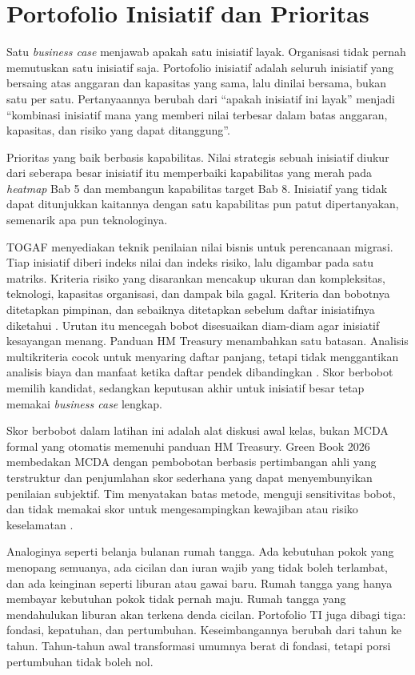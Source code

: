 \section{Portofolio Inisiatif dan Prioritas}

Satu \textit{business case} menjawab apakah satu inisiatif layak. Organisasi
tidak pernah memutuskan satu inisiatif saja. Portofolio inisiatif adalah
seluruh inisiatif yang bersaing atas anggaran dan kapasitas yang sama, lalu
dinilai bersama, bukan satu per satu. Pertanyaannya berubah dari ``apakah
inisiatif ini layak'' menjadi ``kombinasi inisiatif mana yang memberi nilai
terbesar dalam batas anggaran, kapasitas, dan risiko yang dapat
ditanggung''.

Prioritas yang baik berbasis kapabilitas. Nilai strategis sebuah inisiatif
diukur dari seberapa besar inisiatif itu memperbaiki kapabilitas yang merah
pada \textit{heatmap} Bab 5 dan membangun kapabilitas target Bab 8. Inisiatif
yang tidak dapat ditunjukkan kaitannya dengan satu kapabilitas pun patut
dipertanyakan, semenarik apa pun teknologinya.

TOGAF menyediakan teknik penilaian nilai bisnis untuk perencanaan migrasi.
Tiap inisiatif diberi indeks nilai dan indeks risiko, lalu digambar pada satu
matriks. Kriteria risiko yang disarankan mencakup ukuran dan kompleksitas,
teknologi, kapasitas organisasi, dan dampak bila gagal. Kriteria dan bobotnya
ditetapkan pimpinan, dan sebaiknya ditetapkan sebelum daftar inisiatifnya
diketahui \cite{togaf10}. Urutan itu mencegah bobot disesuaikan diam-diam agar
inisiatif kesayangan menang. Panduan HM Treasury menambahkan satu batasan.
Analisis multikriteria cocok untuk menyaring daftar panjang, tetapi tidak
menggantikan analisis biaya dan manfaat ketika daftar pendek dibandingkan
\cite{c13-hmt2024mcda}. Skor berbobot memilih kandidat, sedangkan keputusan
akhir untuk inisiatif besar tetap memakai \textit{business case} lengkap.

Skor berbobot dalam latihan ini adalah alat diskusi awal kelas, bukan
MCDA formal yang otomatis memenuhi panduan HM Treasury. Green Book 2026
membedakan MCDA dengan pembobotan berbasis pertimbangan ahli yang terstruktur
dan penjumlahan skor sederhana yang dapat menyembunyikan penilaian subjektif.
Tim menyatakan batas metode, menguji sensitivitas bobot, dan tidak memakai
skor untuk mengesampingkan kewajiban atau risiko keselamatan
\cite{c13-hmt2026,c13-hmt2024mcda}.

Analoginya seperti belanja bulanan rumah tangga. Ada kebutuhan pokok yang
menopang semuanya, ada cicilan dan iuran wajib yang tidak boleh terlambat,
dan ada keinginan seperti liburan atau gawai baru. Rumah tangga yang hanya
membayar kebutuhan pokok tidak pernah maju. Rumah tangga yang mendahulukan
liburan akan terkena denda cicilan. Portofolio TI juga dibagi tiga: fondasi,
kepatuhan, dan pertumbuhan. Keseimbangannya berubah dari tahun ke tahun.
Tahun-tahun awal transformasi umumnya berat di fondasi, tetapi porsi
pertumbuhan tidak boleh nol.

